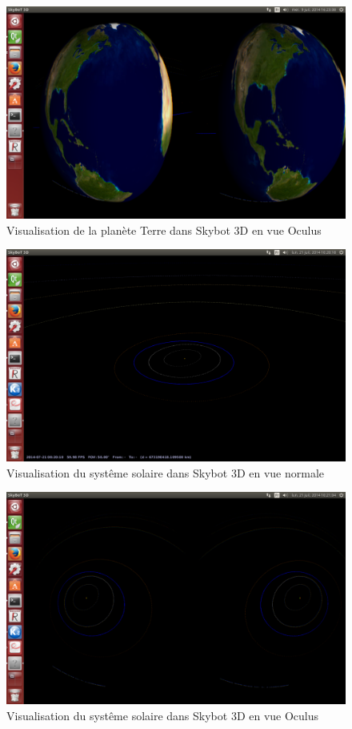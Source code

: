 \documentclass[a4paper,french,12pt]{article}
\begin{document}
		\begin{figure}
			      \centering
			      \includegraphics[width=1.0\textwidth]{skybot_oculus_earth.png}
			      \caption{Visualisation de la planète Terre dans Skybot 3D en vue Oculus}
		\end{figure}
		
		\begin{figure}
			      \centering
			      \includegraphics[width=1.0\textwidth]{skybot_normal.png}
			      \caption{Visualisation du systême solaire dans Skybot 3D en vue normale}
		\end{figure}
		
		\begin{figure}
			      \centering
			      \includegraphics[width=1.0\textwidth]{skybot_oculus.png}
			      \caption{Visualisation du systême solaire dans Skybot 3D en vue Oculus}
		\end{figure}
		
\end{document}
